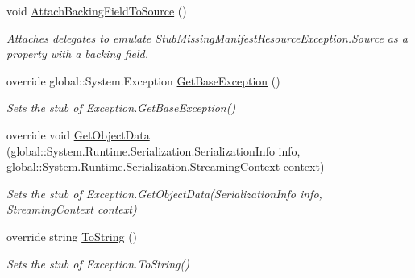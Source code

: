 \begin{DoxyCompactItemize}
void \hyperlink{class_system_1_1_resources_1_1_fakes_1_1_stub_missing_manifest_resource_exception_ab9a58ad35351c4fe31167f4600716deb}{Attach\-Backing\-Field\-To\-Source} ()
\begin{DoxyCompactList}\small\item\em Attaches delegates to emulate \hyperlink{class_system_1_1_resources_1_1_fakes_1_1_stub_missing_manifest_resource_exception_a1e3c0e1b9d485014f923baece22e1a57}{Stub\-Missing\-Manifest\-Resource\-Exception.\-Source} as a property with a backing field.\end{DoxyCompactList}\item 
override global\-::\-System.\-Exception \hyperlink{class_system_1_1_resources_1_1_fakes_1_1_stub_missing_manifest_resource_exception_a620963e22025c9f9d72b4e5f0be81225}{Get\-Base\-Exception} ()
\begin{DoxyCompactList}\small\item\em Sets the stub of Exception.\-Get\-Base\-Exception()\end{DoxyCompactList}\item 
override void \hyperlink{class_system_1_1_resources_1_1_fakes_1_1_stub_missing_manifest_resource_exception_a667fa200f406124197df71c59985bd00}{Get\-Object\-Data} (global\-::\-System.\-Runtime.\-Serialization.\-Serialization\-Info info, global\-::\-System.\-Runtime.\-Serialization.\-Streaming\-Context context)
\begin{DoxyCompactList}\small\item\em Sets the stub of Exception.\-Get\-Object\-Data(\-Serialization\-Info info, Streaming\-Context context)\end{DoxyCompactList}\item 
override string \hyperlink{class_system_1_1_resources_1_1_fakes_1_1_stub_missing_manifest_resource_exception_a918e4eadbc7881c1776022b48048ce08}{To\-String} ()
\begin{DoxyCompactList}\small\item\em Sets the stub of Exception.\-To\-String()\end{DoxyCompactList}\end{DoxyCompactItemize}
